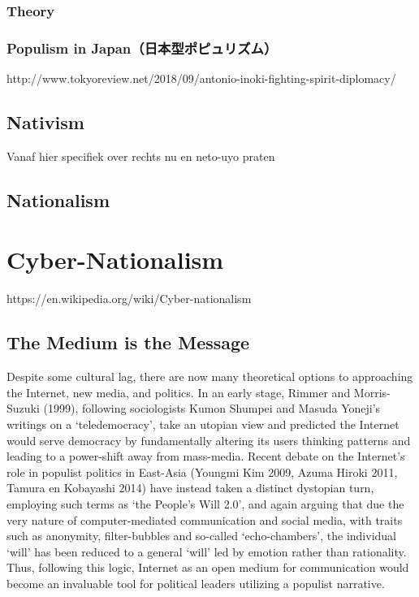 \documentclass[10pt,british,A4paper,,openany]{memoir}
\begin{document}
\subsubsection{Theory}\label{theory}

\subsubsection{Populism in
Japan（日本型ポピュリズム）}\label{populism-in-japanux65e5ux672cux578bux30ddux30d4ux30e5ux30eaux30baux30e0}

http://www.tokyoreview.net/2018/09/antonio-inoki-fighting-spirit-diplomacy/

\subsection{Nativism}\label{nativism}

Vanaf hier specifiek over rechts nu en neto-uyo praten

\subsection{Nationalism}\label{nationalism}

\section{Cyber-Nationalism}\label{cyber-nationalism}

https://en.wikipedia.org/wiki/Cyber-nationalism

\subsection{The Medium is the Message}\label{the-medium-is-the-message}

Despite some cultural lag, there are now many theoretical options to
approaching the Internet, new media, and politics. In an early stage,
Rimmer and Morris-Suzuki (1999), following sociologists Kumon Shumpei
and Masuda Yoneji's writings on a `teledemocracy', take an utopian view
and predicted the Internet would serve democracy by fundamentally
altering its users thinking patterns and leading to a power-shift away
from mass-media. Recent debate on the Internet's role in populist
politics in East-Asia (Youngmi Kim 2009, Azuma Hiroki 2011, Tamura en
Kobayashi 2014) have instead taken a distinct dystopian turn, employing
such terms as `the People's Will 2.0', and again arguing that due the
very nature of computer-mediated communication and social media, with
traits such as anonymity, filter-bubbles and so-called `echo-chambers',
the individual `will' has been reduced to a general `will' led by
emotion rather than rationality. Thus, following this logic, Internet as
an open medium for communication would become an invaluable tool for
political leaders utilizing a populist narrative.
\end{document}
